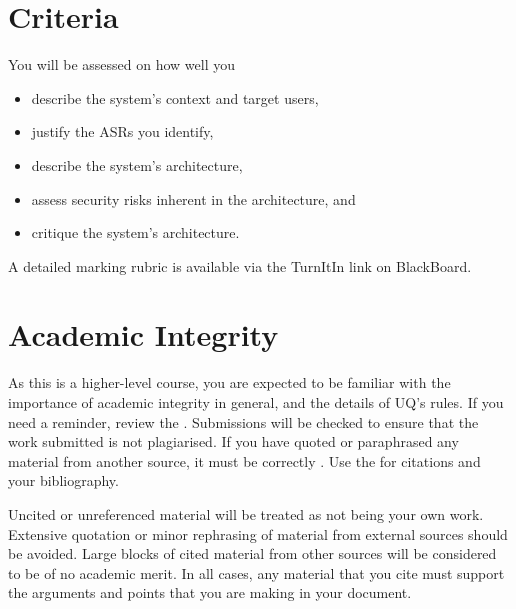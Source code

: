 \documentclass{csse4400}
\begin{document}
\section{Criteria}
You will be assessed on how well you
\begin{itemize}
    \item describe the system's context and target users,
    \item justify the ASRs you identify,
    \item describe the system's architecture,
    \item assess security risks inherent in the architecture, and
    \item critique the system's architecture.
\end{itemize}

\noindent
A detailed marking rubric is available via the TurnItIn link on BlackBoard.

\section{Academic Integrity}
As this is a higher-level course, you are expected to be familiar with the importance of academic integrity in general, and the details of UQ's rules.
If you need a reminder, review the .
Submissions will be checked to ensure that the work submitted is not plagiarised.
If you have quoted or paraphrased any material from another source, it must be correctly .
Use the  for citations and your bibliography.

Uncited or unreferenced material will be treated as not being your own work.
Extensive quotation or minor rephrasing of material from external sources should be avoided.
Large blocks of cited material from other sources will be considered to be of no academic merit.
In all cases, any material that you cite must support the arguments and points that you are making in your document.

%
%
\end{document}
